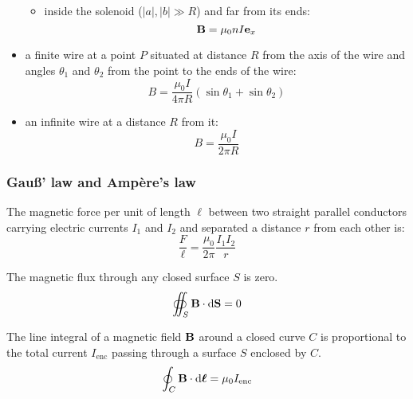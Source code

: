\documentclass[../../../main.tex]{subfiles}
\begin{document}
\begin{multicols}{2}
\begin{prop}
\begin{itemize}
\begin{itemize}
\begin{center}
\begin{minipage}{\linewidth}
                      \end{minipage}
                    \end{center}
              \item inside the solenoid ($|a|,|b|\gg R$) and far from its ends: $$\boldsymbol{\mathrm{B}}=\mu_0 nI\boldsymbol{\mathrm{e}}_x$$
            \end{itemize}
      \item a finite wire at a point $P$ situated at distance $R$ from the axis of the wire and angles $\theta_1$ and $\theta_2$ from the point to the ends of the wire: $$B=\frac{\mu_0I}{4\pi R}(\sin\theta_1+\sin\theta_2)$$
            \begin{center}
              \begin{minipage}{\linewidth}
                \centering
                
              \end{minipage}
            \end{center}
      \item an infinite wire at a distance $R$ from it: $$B=\frac{\mu_0I}{2\pi R}$$
    \end{itemize}
  \end{prop}
  \subsubsection{Gau\ss' law and Ampère's law}
  \begin{prop}
    The magnetic force per unit of length $\ell$ between two straight parallel conductors carrying electric currents $I_1$ and $I_2$ and separated a distance $r$ from each other is: $$\frac{F}{\ell}=\frac{\mu_0}{2\pi}\frac{I_1I_2}{r}$$
  \end{prop}
  \begin{law}
    The magnetic flux through any closed surface $S$ is zero.
    $$\oiint_S\boldsymbol{\mathrm{B}}\cdot\dd\boldsymbol{\mathrm{S}}=0$$
  \end{law}
  \begin{law}
    The line integral of a magnetic field $\boldsymbol{\mathrm{B}}$ around a closed curve $C$ is proportional to the total current $I_\text{enc}$ passing through a surface $S$ enclosed by $C$.
    $$\oint_C\boldsymbol{\mathrm{B}}\cdot\dd\boldsymbol{\mathrm{\ell}}=\mu_0I_\text{enc}$$
  \end{law}

\end{multicols}
\end{document}
